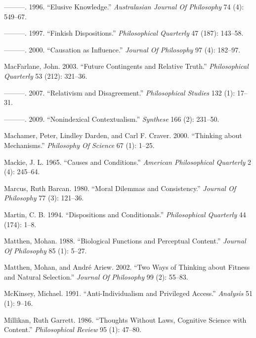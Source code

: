 \documentclass[
  10pt,
  letterpaper,
  DIV=11,
  numbers=noendperiod,
  twoside]{scrartcl}
\newlength{\cslhangindent}
\newenvironment{CSLReferences}[2] %
 {\begin{list}{}{%
  \setlength{\itemindent}{0pt}
  \setlength{\leftmargin}{0pt}
  \setlength{\parsep}{0pt}
  \ifodd #1
   \setlength{\leftmargin}{\cslhangindent}
   \setlength{\itemindent}{-1\cslhangindent}
  \fi
  \setlength{\itemsep}{#2\baselineskip}}}
 {\end{list}}
\begin{document}
\begin{CSLReferences}{1}{0}
---------. 1996. {``Elusive Knowledge.''} \emph{Australasian Journal Of
Philosophy} 74 (4): 549--67.

---------. 1997. {``Finkish Dispositions.''} \emph{Philosophical
Quarterly} 47 (187): 143--58.

---------. 2000. {``Causation as Influence.''} \emph{Journal Of
Philosophy} 97 (4): 182--97.

MacFarlane, John. 2003. {``Future Contingents and Relative Truth.''}
\emph{Philosophical Quarterly} 53 (212): 321--36.

---------. 2007. {``Relativism and Disagreement.''} \emph{Philosophical
Studies} 132 (1): 17--31.

---------. 2009. {``Nonindexical Contextualism.''} \emph{Synthese} 166
(2): 231--50.

Machamer, Peter, Lindley Darden, and Carl F. Craver. 2000. {``Thinking
about Mechanisms.''} \emph{Philosophy Of Science} 67 (1): 1--25.

Mackie, J. L. 1965. {``Causes and Conditions.''} \emph{American
Philosophical Quarterly} 2 (4): 245--64.

Marcus, Ruth Barcan. 1980. {``Moral Dilemmas and Consistency.''}
\emph{Journal Of Philosophy} 77 (3): 121--36.

Martin, C. B. 1994. {``Dispositions and Conditionals.''}
\emph{Philosophical Quarterly} 44 (174): 1--8.

Matthen, Mohan. 1988. {``Biological Functions and Perceptual Content.''}
\emph{Journal Of Philosophy} 85 (1): 5--27.

Matthen, Mohan, and André Ariew. 2002. {``Two Ways of Thinking about
Fitness and Natural Selection.''} \emph{Journal Of Philosophy} 99 (2):
55--83.

McKinsey, Michael. 1991. {``Anti-Individualism and Privileged Access.''}
\emph{Analysis} 51 (1): 9--16.

Millikan, Ruth Garrett. 1986. {``Thoughts Without Laws, Cognitive
Science with Content.''} \emph{Philosophical Review} 95 (1): 47--80.


\end{CSLReferences}
\end{document}
